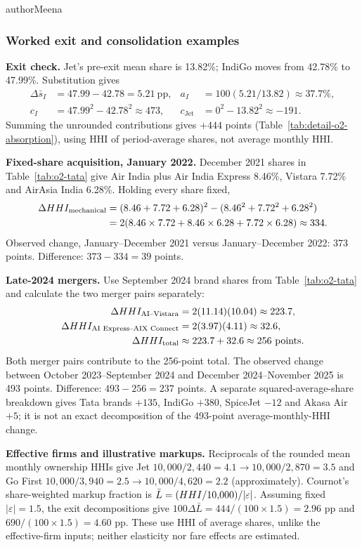 \begin{mergedcontribution}{authorMeena}
\subsubsection{Worked exit and consolidation examples}
\label{app:workings}
\textbf{Exit check.} Jet's pre-exit mean share is 13.82\%; IndiGo moves from 42.78\% to 47.99\%. Substitution gives
\[
\begin{aligned}
\Delta\bar s_I&=47.99-42.78=5.21\ \mathrm{pp}, &
a_I&=100(5.21/13.82)\approx37.7\%,\\
c_I&=47.99^2-42.78^2\approx473, &
c_{\mathrm{Jet}}&=0^2-13.82^2\approx-191.
\end{aligned}
\]
Summing the unrounded contributions gives $+444$ points (Table~\ref{tab:detail-o2-absorption}), using HHI of period-average shares, not average monthly HHI.

\textbf{Fixed-share acquisition, January 2022.} December 2021 shares in Table~\ref{tab:o2-tata} give Air India plus Air India Express 8.46\%, Vistara 7.72\% and AirAsia India 6.28\%. Holding every share fixed,
\[
\begin{aligned}
\Delta HHI_{\mathrm{mechanical}}
&=(8.46+7.72+6.28)^2-(8.46^2+7.72^2+6.28^2)\\
&=2(8.46\times7.72+8.46\times6.28+7.72\times6.28)\approx334.
\end{aligned}
\]
Observed change, January--December 2021 versus January--December 2022: 373 points. Difference: $373-334=39$ points.

\textbf{Late-2024 mergers.} Use September 2024 brand shares from Table~\ref{tab:o2-tata} and calculate the two merger pairs separately:
\[
\begin{aligned}
\Delta HHI_{\text{AI--Vistara}} &= 2(11.14)(10.04) \approx 223.7,\\
\Delta HHI_{\text{AI Express--AIX Connect}} &= 2(3.97)(4.11) \approx 32.6,\\
\Delta HHI_{\text{total}} &\approx 223.7+32.6 \approx 256\text{ points}.
\end{aligned}
\]
Both merger pairs contribute to the 256-point total. The observed change between October 2023--September 2024 and December 2024--November 2025 is 493 points. Difference: $493-256=237$ points. A separate squared-average-share breakdown gives Tata brands $+135$, IndiGo $+380$, SpiceJet $-12$ and Akasa Air $+5$; it is not an exact decomposition of the 493-point average-monthly-HHI change.

\textbf{Effective firms and illustrative markups.} Reciprocals of the rounded mean monthly ownership HHIs give Jet $10{,}000/2{,}440=4.1\to10{,}000/2{,}870=3.5$ and Go First $10{,}000/3{,}940=2.5\to10{,}000/4{,}620=2.2$ (approximately). Cournot's share-weighted markup fraction is $\bar L=(HHI/10{,}000)/|\varepsilon|$. Assuming fixed $|\varepsilon|=1.5$, the exit decompositions give $100\Delta\bar L=444/(100\times1.5)=2.96$ pp and $690/(100\times1.5)=4.60$ pp. These use HHI of average shares, unlike the effective-firm inputs; neither elasticity nor fare effects are estimated.


\end{mergedcontribution}
